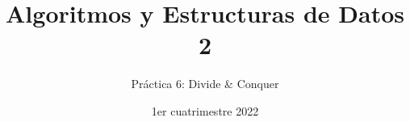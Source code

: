 

\title{Algoritmos y Estructuras de Datos 2}
\author{Práctica 6: Divide \& Conquer}
\date{1er cuatrimestre 2022}



\maketitle
\tableofcontents
\newpage















